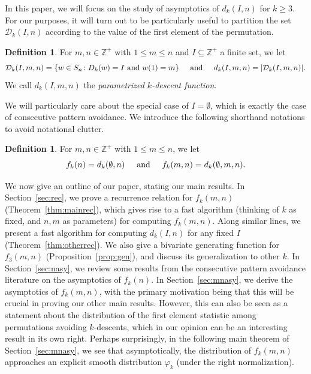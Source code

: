 \documentclass{amsart}
\theoremstyle{definition}
\newtheorem{definition}[theorem]{Definition}
\begin{document}
In this paper, we will focus on the study of asymptotics of $d_k(I,n)$ for $k\geq 3$. For our purposes, it will turn out to be particularly useful to partition the set $\mathcal{D}_k(I,n)$ according to the value of the first element of the permutation.
\begin{definition} For $m,n\in \mathbb{Z}^+$ with $1\leq m\leq n$ and $I\subseteq \mathbb{Z}^+$ a finite set, we let
\[\mathcal{D}_k(I,m,n)=\{w\in S_n\colon D_k(w)=I \text{ and } w(1)=m\}\hspace{5mm}\text{and}\hspace{5mm} d_k(I,m,n)=|\mathcal{D}_k(I,m,n)|.\]
We call $d_k(I,m,n)$ the \emph{parametrized $k$-descent function}. 
\end{definition}



We will particularly care about the special case of $I=\emptyset$, which is exactly the case of consecutive pattern avoidance. We introduce the following shorthand notations to avoid notational clutter.
\begin{definition}
For $m,n\in \mathbb{Z}^+$ with $1\leq m\leq n$, we let
\[f_k(n)=d_k(\emptyset, n)\hspace{5mm} \text{and}\hspace{5mm} f_k(m,n)=d_k(\emptyset, m,n).\]
\end{definition}

We now give an outline of our paper, stating our main results. In Section~\ref{sec:rec}, we prove a recurrence relation for $f_k(m,n)$ (Theorem~\ref{thm:mainrec}), which gives rise to a fast algorithm (thinking of $k$ as fixed, and $n,m$ as parameters) for computing $f_k(m,n)$. Along similar lines, we present a fast algorithm for computing $d_k(I,n)$ for any fixed $I$ (Theorem~\ref{thm:otherrec}). We also give a bivariate generating function for $f_3(m,n)$ (Proposition~\ref{prop:gen}), and discuss its generalization to other $k$. In Section~\ref{sec:nasy}, we review some results from the consecutive pattern avoidance literature on the asymptotics of $f_k(n)$. In Section~\ref{sec:mnasy}, we derive the asymptotics of $f_k(m,n)$, with the primary motivation being that this will be crucial in proving our other main results. However, this can also be seen as a statement about the distribution of the first element statistic among permutations avoiding $k$-descents, which in our opinion can be an interesting result in its own right. Perhaps surprisingly, in the following main theorem of Section~\ref{sec:mnasy}, we see that asymptotically, the distribution of $f_k(m,n)$ approaches an explicit smooth distribution $\varphi_k$ (under the right normalization).
\end{document}
